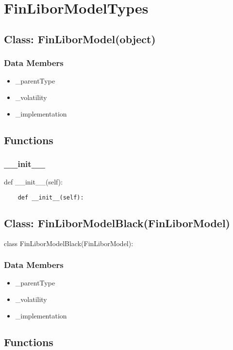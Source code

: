 \documentclass[twoside,11pt]{book}
\begin{document}
\newpage
\section{FinLiborModelTypes}

\subsection*{Class: FinLiborModel(object)}


\subsubsection*{Data Members}
\begin{itemize}
\item{\_parentType}
\item{\_volatility}
\item{\_implementation}
\end{itemize}

\subsection*{Functions}

\subsubsection*{{\bf \_\_init\_\_}}
def \_\_init\_\_(self): 

\begin{lstlisting}
    def __init__(self):
\end{lstlisting}

\subsection*{Class: FinLiborModelBlack(FinLiborModel)}
class FinLiborModelBlack(FinLiborModel): 

\subsubsection*{Data Members}
\begin{itemize}
\item{\_parentType}
\item{\_volatility}
\item{\_implementation}
\end{itemize}

\subsection*{Functions}
\end{document}
